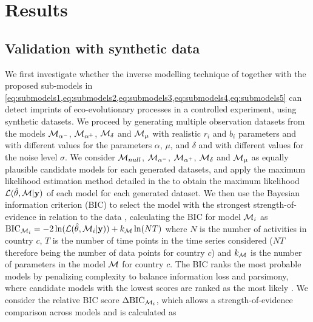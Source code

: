 
\section{Results}
\label{sec:results}
\subsection{Validation with synthetic data}\label{sec:synthetic}
We first investigate whether the inverse modelling technique of \cite{Boussange2022a} together with the proposed sub-models in \cref{eq:submodels1,eq:submodels2,eq:submodels3,eq:submodels4,eq:submodels5} can detect imprints of eco-evolutionary processes in a controlled experiment, using synthetic datasets.
%
We proceed by generating multiple observation datasets from the models $\mathcal{M}_{\alpha^-}$, $\mathcal{M}_{\alpha^+}$, $\mathcal{M}_\delta$ and $\mathcal{M}_\mu$ with realistic $r_i$ and $b_i$ parameters and with different values for the parameters $\alpha$, $\mu$, and $\delta$ and with different values for the noise level $\sigma$. We consider $\mathcal{M}_{null}$, $\mathcal{M}_{\alpha^-}$, $\mathcal{M}_{\alpha^+}$, $\mathcal{M}_\delta$ and $\mathcal{M}_\mu$ as equally plausible candidate models for each generated datasets, and apply the maximum likelihood estimation method detailed in the  to obtain the maximum likelihood $\mathcal{L}(\hat \theta, \mathcal{M} | \textbf{y})$ of each model for each generated dataset. We then use the Bayesian information criterion (BIC) to select the model with the strongest strength-of-evidence in relation to the data \cite{Mangan2017}, calculating the BIC for model $\mathcal{M}_i$ as $\text{BIC}_{\mathcal{M}_i} = -2 \ln(\mathcal{L}(\hat \theta, \mathcal{M}_i | \textbf{y})) + k_{\mathcal{M}} \ln(N T ) $
% 
where $N$ is the number of activities in country $c$, $T$ is the number of time points in the time series considered ($N T$ therefore being the number of data points for country $c$) and $k_{\mathcal{M}}$ is the number of parameters in the model $\mathcal{M}$ for country $c$.
% 
The BIC ranks the most probable models by penalizing complexity to balance information loss and parsimony, where candidate models with the lowest scores are ranked as the most likely \cite{Mangan2017}.
% 
We consider the relative BIC score $\Delta \text{BIC}_{\mathcal{M}_i}$, which allows a strength-of-evidence comparison across models and is calculated as 
